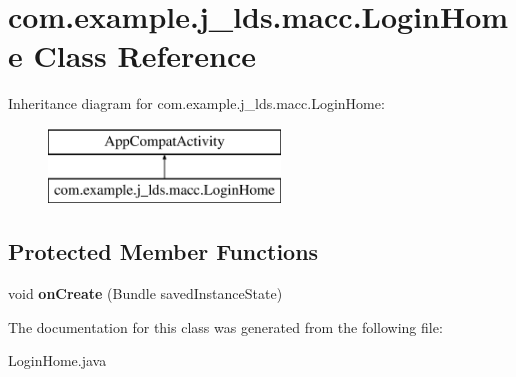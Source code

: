\hypertarget{classcom_1_1example_1_1j__lds_1_1macc_1_1_login_home}{}\section{com.\+example.\+j\+\_\+lds.\+macc.\+Login\+Home Class Reference}
\label{classcom_1_1example_1_1j__lds_1_1macc_1_1_login_home}
Inheritance diagram for com.\+example.\+j\+\_\+lds.\+macc.\+Login\+Home\+:\begin{figure}[H]
\begin{center}
\leavevmode
\includegraphics[height=2.000000cm]{classcom_1_1example_1_1j__lds_1_1macc_1_1_login_home}
\end{center}
\end{figure}
\subsection*{Protected Member Functions}
\begin{DoxyCompactItemize}
\item 
\mbox{\label{classcom_1_1example_1_1j__lds_1_1macc_1_1_login_home_ae5a72dc4fded6a8c56a7268952a372ec}} 
void {\bfseries on\+Create} (Bundle saved\+Instance\+State)
\end{DoxyCompactItemize}


The documentation for this class was generated from the following file\+:\begin{DoxyCompactItemize}
\item 
Login\+Home.\+java\end{DoxyCompactItemize}
